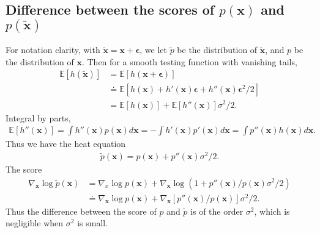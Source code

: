 \documentclass{article} \usepackage{iclr2021_conference,times}
\def\rvx{{\mathbf{x}}}
\newcommand{\E}{\mathbb{E}}
\def\trvx{\tilde{\rvx}}
\def\beps{\bm{\epsilon}}
\begin{document}
\subsection{Difference between the scores of $p(\rvx)$ and $p(\trvx)$} \label{app:diff}
For notation clarity, with 
 $\trvx = \rvx + \beps$, we let $\widetilde{p}$ be the distribution of $\trvx$, and $p$ be the distribution of $\rvx$. Then for a smooth testing function with vanishing tails, 
 \begin{align} 
 \E[h(\trvx)] &= \E[h(\rvx + \beps)] \\
 & \doteq \E[h(\rvx) + h'(\rvx) \beps + h''(\rvx) \beps^2/2] \\
 &= \E[h(\rvx)] + \E[h''(\rvx)] \sigma^2/2. 
\end{align} 
Integral by parts, 
\begin{align} 
\E[h''(\rvx)] = \int h''(\rvx) p(\rvx) d\rvx = - \int h'(\rvx) p'(\rvx) d\rvx = \int p''(\rvx) h(\rvx) d\rvx. 
\end{align}
Thus we have the heat equation
\begin{eqnarray} 
\widetilde{p}(\rvx) = p(\rvx) + p''(\rvx) \sigma^2/2. 
\end{eqnarray} 
The score 
\begin{align} 
  \nabla_\rvx \log \tilde{p}(\rvx) &= \nabla_x \log p(\rvx) + \nabla_\rvx  \log (1 + p''(\rvx)/p(\rvx) \sigma^2/2) \\
  & \doteq \nabla_\rvx \log p(\rvx) + \nabla_\rvx [p''(\rvx)/p(\rvx)] \sigma^2/2. 
  \end{align} 
  Thus the difference between the score of $p$ and $\widetilde{p}$ is of the order $\sigma^2$, which is negligible when $\sigma^2$ is small. 
\end{document}
